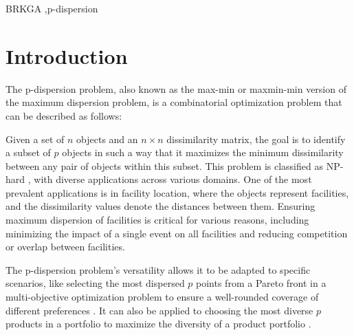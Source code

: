 \documentclass[preprint,12pt]{elsarticle}
\begin{document}
\begin{frontmatter}


\begin{keyword}
BRKGA \sep p-dispersion
\end{keyword}

\end{frontmatter}


\section{Introduction}
\label{sec:intro}

The p-dispersion problem, also known as the max-min or maxmin-min version of the maximum dispersion problem, is a combinatorial optimization problem that can be described as follows:

Given a set of $n$ objects and an $n \times n$ dissimilarity matrix, the goal is to identify a subset of $p$ objects in such a way that it maximizes the minimum dissimilarity between any pair of objects within this subset. This problem is classified as NP-hard \citet{Erkut1990-mo}, with diverse applications across various domains. One of the most prevalent applications is in facility location, where the objects represent facilities, and the dissimilarity values denote the distances between them. Ensuring maximum dispersion of facilities is critical for various reasons, including minimizing the impact of a single event on all facilities and reducing competition or overlap between facilities.

The p-dispersion problem's versatility allows it to be adapted to specific scenarios, like selecting the most dispersed $p$ points from a Pareto front in a multi-objective optimization problem to ensure a well-rounded coverage of different preferences \citet{Dupin2023-vx}. It can also be applied to choosing the most diverse $p$ products in a portfolio to maximize the diversity of a product portfolio \citet{Erkut1990-mo}.
\end{document}

